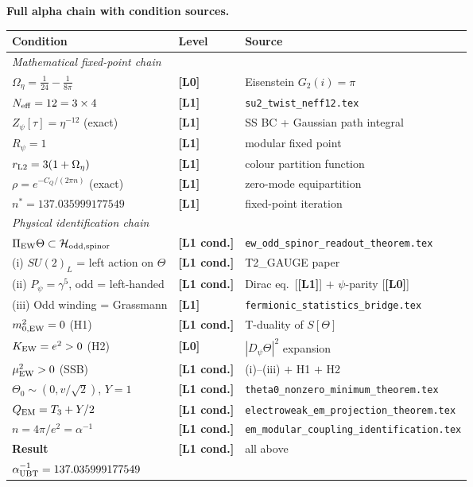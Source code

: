 \documentclass[12pt,a4paper]{article}
\theoremstyle{remark}\newtheorem{remark}[theorem]{Remark}
\newcommand{\Lz}{\textbf{[L0]}}
\newcommand{\Lo}{\textbf{[L1]}}
\newcommand{\Lc}{\textbf{[L1 cond.]}}
\begin{document}
\begin{resultbox}
\textbf{Full alpha chain with condition sources.}

\begin{center}
\renewcommand{\arraystretch}{1.3}
\begin{tabular}{p{4.5cm}lp{5cm}}
\toprule
Condition & Level & Source \\
\midrule
\multicolumn{3}{l}{\textit{Mathematical fixed-point chain}} \\
$\Omega_\eta=\tfrac{1}{24}-\tfrac{1}{8\pi}$ & \Lz & Eisenstein $G_2(i)=\pi$ \\
$N_{\rm eff}=12=3\times4$ & \Lo & \texttt{su2\_twist\_neff12.tex} \\
$Z_\psi[\tau]=\eta^{-12}$ (exact) & \Lo & SS BC + Gaussian path integral \\
$R_\psi=1$ & \Lo & modular fixed point \\
$r_{\rm L2}=3(1+\Omega_\eta)$ & \Lo & colour partition function \\
$\rho=e^{-C_Q/(2\pi n)}$ (exact) & \Lo & zero-mode equipartition \\
$n^*=137.035999177549$ & \Lo & fixed-point iteration \\
\midrule
\multicolumn{3}{l}{\textit{Physical identification chain}} \\
$\Pi_{\rm EW}\Theta\subset\mathcal{H}_{\rm odd,spinor}$ & \Lc &
  \texttt{ew\_odd\_spinor\_readout\_theorem.tex} \\
\quad (i) $SU(2)_L$ = left action on $\Theta$ & \Lc & T2\_GAUGE paper \\
\quad (ii) $P_\psi=\gamma^5$, odd = left-handed & \Lc &
  Dirac eq.\ [\Lo] $+$ $\psi$-parity [\Lz] \\
\quad (iii) Odd winding = Grassmann & \Lo &
  \texttt{fermionic\_statistics\_bridge.tex} \\
$m^2_{0,\rm EW}=0$ (H1) & \Lc & T-duality of $S[\Theta]$ \\
$K_{\rm EW}=e^2>0$ (H2) & \Lz & $|D_\psi\Theta|^2$ expansion \\
$\mu^2_{\rm EW}>0$ (SSB) & \Lc & (i)--(iii) $+$ H1 $+$ H2 \\
$\Theta_0\sim(0,v/\sqrt{2})$, $Y=1$ & \Lc &
  \texttt{theta0\_nonzero\_minimum\_theorem.tex} \\
$Q_{\rm EM}=T_3+Y/2$ & \Lc &
  \texttt{electroweak\_em\_projection\_theorem.tex} \\
$n=4\pi/e^2=\alpha^{-1}$ & \Lc &
  \texttt{em\_modular\_coupling\_identification.tex} \\
\midrule
\textbf{Result} & \Lc & all above \\
$\alpha^{-1}_{\rm UBT}=137.035999177549$ & & \\
\bottomrule
\end{tabular}
\end{center}
\end{resultbox}
\end{document}
